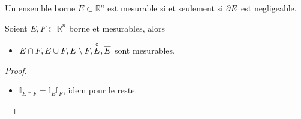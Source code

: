 \documentclass[../main.tex]{subfiles}
\begin{document}
\begin{thm}
Un ensemble borne $E \subset \mathbb{R}^n$ est mesurable si et seulement si $\partial E$ est negligeable.
\end{thm}
\begin{crly}
Soient $E, F \subset \mathbb{R}^n$ borne et mesurables, alors
\begin{itemize}
\item $E \cap F, E \cup F, E \setminus F, \overset{\circ}{E}, \overline{E}$ sont mesurables.
\end{itemize}

\end{crly}
\begin{proof}
\begin{itemize}
\item $\mathbb{I}_{E \cap F} = \mathbb{I}_E \mathbb{I}_F$, idem pour le reste.
\end{itemize}

\end{proof}
\end{document}
